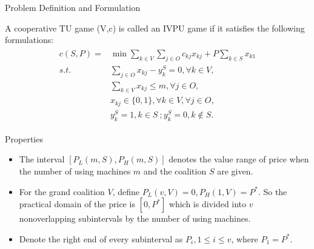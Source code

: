 \documentclass[14pt]{beamer}
\begin{document}
\begin{frame}{Problem Definition and Formulation}
	\begin{definition}\label{definition:IVPU}
	\small
	\justifying
	A cooperative TU game (V,c) is called an IVPU game if it satisfies the following formulations:\\
	\pause
	\vspace{-8mm}
	\begin{eqnarray*}\label{eqn:IVPU}
	\begin{aligned}
	c(S,P) = & {\min} \sum_{k\in V}\sum_{j\in O} {c_{kj} x_{kj}} + {P\sum_{k\in S} x_{k1}} \\
	{s.t.}\quad & \sum_{j \in O} x_{kj}-y_k^S=0, \forall k \in V, \\
	& \sum_{k\in V} x_{kj} \leq m,\forall j \in O,  \\
	& x_{kj} \in \{0,1\} , \forall k \in V, \forall j \in O,\\
	& y_k^S=1, k \in S~; y_k^S=0, k \notin S.
	\end{aligned}
	\end{eqnarray*}
	\end{definition}
\end{frame}

\begin{frame}{Properties}
	\begin{definition}\label{definition:subinterval}
	\small
	\justifying
	\begin{itemize}
	\item The interval $[P_L(m,S),P_H(m,S)]$ denotes the value range of price when the number of using machines $m$ and the coalition $S$ are given.
	\pause
	\item For the grand coalition $V$, define $P_L(v,V) = 0, P_H(1,V) = P^*$. So the practical domain of the price is $[0,P^*]$ which is divided into $v$ nonoverlapping subintervals by the number of using machines.
	\pause
	\item Denote the right end of every subinterval as $P_i, 1 \leq i \leq v$, where $P_1 = P^*$.
	\end{itemize}
	\end{definition}
\end{frame}
\end{document}

